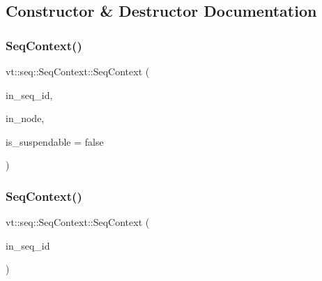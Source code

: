 \subsection{Constructor \& Destructor Documentation}
\mbox{\label{structvt_1_1seq_1_1_seq_context_a3f994bf7ead90f03320b94bc2797039b}} 
\subsubsection{\texorpdfstring{Seq\+Context()}{SeqContext()}\hspace{0.1cm}{\footnotesize\ttfamily [1/3]}}
{\footnotesize\ttfamily vt\+::seq\+::\+Seq\+Context\+::\+Seq\+Context (\begin{DoxyParamCaption}\item[{\hyperlink{namespacevt_1_1seq_a3b612da217ac669d39c159f134ab8434}{Seq\+Type} const \&}]{in\+\_\+seq\+\_\+id,  }\item[{\hyperlink{namespacevt_1_1seq_ae6a4874b585be0612aaca32ca6d2d191}{Seq\+Node\+Ptr\+Type}}]{in\+\_\+node,  }\item[{bool}]{is\+\_\+suspendable = {\ttfamily false} }\end{DoxyParamCaption})}

\mbox{\label{structvt_1_1seq_1_1_seq_context_a797189d52bbfd7eb2f776119068461bd}} 
\subsubsection{\texorpdfstring{Seq\+Context()}{SeqContext()}\hspace{0.1cm}{\footnotesize\ttfamily [2/3]}}
{\footnotesize\ttfamily vt\+::seq\+::\+Seq\+Context\+::\+Seq\+Context (\begin{DoxyParamCaption}\item[{\hyperlink{namespacevt_1_1seq_a3b612da217ac669d39c159f134ab8434}{Seq\+Type} const \&}]{in\+\_\+seq\+\_\+id }\end{DoxyParamCaption})}

\mbox{\label{structvt_1_1seq_1_1_seq_context_a296fda6917a2f69772f8f1b9faceeadb}} 
